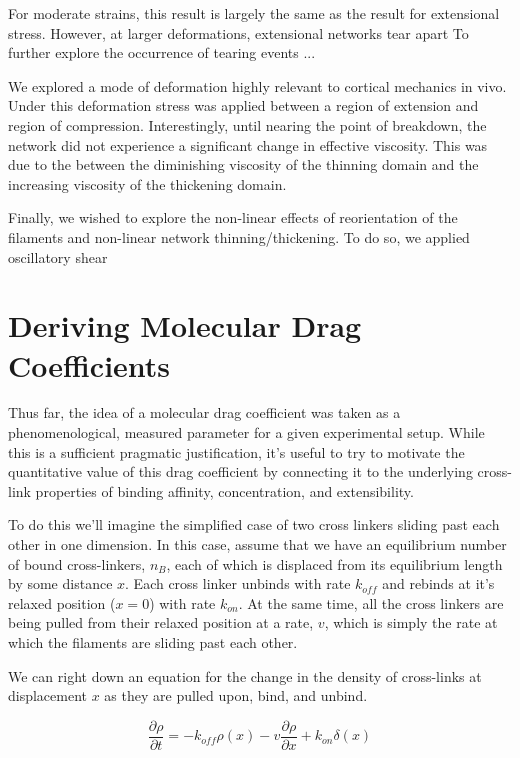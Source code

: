\documentclass[pre,preprint]{revtex4-1}
\begin{document}
For moderate strains, this result is largely the same as the result for extensional stress.  However, at larger deformations, extensional networks tear apart
To further explore the occurrence of tearing events ...


We explored a mode of deformation highly relevant to cortical mechanics in vivo.  Under this deformation stress was applied between a region of extension and region of compression.  Interestingly, until nearing the point of breakdown, the network did not experience a significant change in effective viscosity.  This was due to the between the diminishing viscosity of the thinning domain and the increasing viscosity of the thickening domain.  


Finally, we wished to explore the non-linear effects of reorientation of the filaments and non-linear network thinning/thickening.  To do so, we applied oscillatory shear 



\section{Deriving Molecular Drag Coefficients}
\label{app:drag}
Thus far, the idea of a molecular drag coefficient was taken as a phenomenological, measured parameter for a given experimental setup.  While this is a sufficient pragmatic justification, it's useful to try to motivate the quantitative value of this drag coefficient by connecting it to the underlying cross-link properties of binding affinity, concentration, and extensibility.

To do this we'll imagine the simplified case of two cross linkers sliding past each other in one dimension.  In this case, assume that we have an equilibrium number of bound cross-linkers, $n_B$, each of which is displaced from its equilibrium length by some distance $x$.  Each cross linker unbinds with rate $k_{off}$ and rebinds at it's relaxed position ($x=0$) with rate $k_{on}$.  At the same time, all the cross linkers are being pulled from their relaxed position at a rate, $v$, which is simply the rate at which the filaments are sliding past each other.  

We can right down an equation for the change in the density of cross-links at displacement $x$ as they are pulled upon, bind, and unbind.

\begin{equation}
\frac{\partial \rho}{\partial t} = -k_{off}\rho(x) - v\frac{\partial \rho}{\partial x} + k_{on}\delta(x)
\end{equation}
\end{document}
